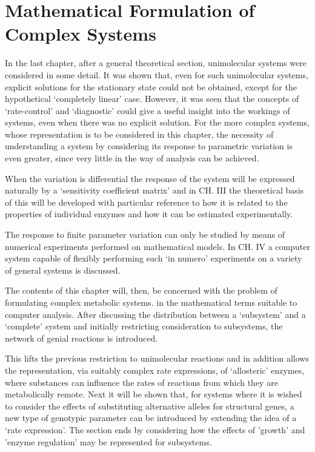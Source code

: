 

\chapter{Mathematical Formulation of Complex Systems}

In the last chapter, after a general theoretical section, unimolecular systems were considered in some detail. It was shown that, even for such unimolecular systems, explicit solutions for the stationary state could not be obtained, except for the hypothetical `completely linear' case. However, it was seen that the concepts of `rate-control' and `diagnostic' could give a useful insight into the workings of systems, even when there was no explicit solution. For the more complex systems, whose representation is to be considered in this chapter, the necessity of understanding a system by considering its response to parametric variation is even greater, since very little in the way of analysis can be achieved.

When the variation is differential the response of the system will be expressed naturally by a `sensitivity coefficient matrix' and in CH. III the theoretical basis of this will be developed with particular reference to how it is related to the properties of individual enzymes and how it can be estimated experimentally.

The response to finite parameter variation can only be studied by means of numerical experiments performed on mathematical models. In CH. IV a computer system capable of flexibly performing such `in numero' experiments on a variety of general systems is discussed.

The contents of this chapter will, then, be concerned with the problem of formulating complex metabolic systems. in the mathematical terms suitable to computer analysis. After discussing the distribution between a `subsystem' and a `complete' system and initially restricting consideration to subsystems, the network of genial reactions is introduced.

This lifts the previous restriction to unimolecular reactions and in addition allows the representation, via suitably complex rate expressions, of `allosteric' enzymes, where substances can influence the rates of reactions from which they are metabolically remote. Next it will be shown that, for systems where it is wished to consider the effects of substituting alternative alleles for structural genes, a new type of genotypic parameter can be introduced by extending the idea of a `rate expression'. The section ends by considering how the effects of 'growth' and 'enzyme regulation' may be represented for subsystems.

